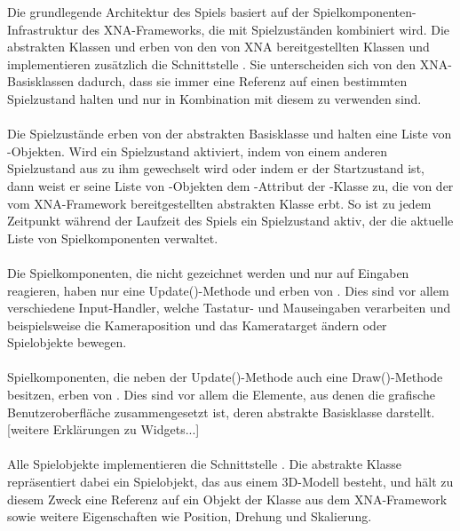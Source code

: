 Die grundlegende Architektur des Spiels basiert auf der Spielkomponenten-Infrastruktur des XNA-Frameworks, die mit Spielzuständen kombiniert wird. Die abstrakten Klassen  und  erben von den von XNA bereitgestellten Klassen  und  implementieren zusätzlich die Schnittstelle . Sie unterscheiden sich von den XNA-Basisklassen dadurch, dass sie immer eine Referenz auf einen bestimmten Spielzustand halten und nur in Kombination mit diesem zu verwenden sind.
\\\\
Die Spielzustände erben von der abstrakten Basisklasse  und halten eine Liste von -Objekten. Wird ein Spielzustand aktiviert, indem von einem anderen Spielzustand aus zu ihm gewechselt wird oder indem er der Startzustand ist, dann weist er seine Liste von -Objekten dem -Attribut der -Klasse zu, die von der vom XNA-Framework bereitgestellten abstrakten Klasse  erbt. So ist zu jedem Zeitpunkt während der Laufzeit des Spiels ein Spielzustand aktiv, der die aktuelle Liste von Spielkomponenten verwaltet.
\\\\
Die Spielkomponenten, die nicht gezeichnet werden und nur auf Eingaben reagieren, haben nur eine Update()-Methode und erben von . Dies sind vor allem verschiedene Input-Handler, welche Tastatur- und Mauseingaben verarbeiten und beispielsweise die Kameraposition und das Kameratarget ändern oder Spielobjekte bewegen.
\\\\
Spielkomponenten, die neben der Update()-Methode auch eine Draw()-Methode besitzen, erben von . Dies sind vor allem die Elemente, aus denen die grafische Benutzeroberfläche zusammengesetzt ist, deren abstrakte Basisklasse  darstellt. [weitere Erklärungen zu Widgets...]
\\\\
Alle Spielobjekte implementieren die Schnittstelle . Die abstrakte Klasse  repräsentiert dabei ein Spielobjekt, das aus einem 3D-Modell besteht, und hält zu diesem Zweck eine Referenz auf ein Objekt der Klasse  aus dem XNA-Framework sowie weitere Eigenschaften wie Position, Drehung und Skalierung.

